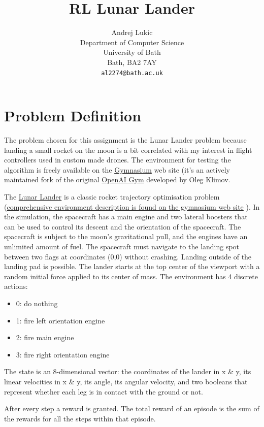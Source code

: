 \documentclass{article}
\title{RL Lunar Lander}
\author{
  Andrej Lukic
  \\
  Department of Computer Science\\
  University of Bath\\
  Bath, BA2 7AY \\
  \texttt{al2274@bath.ac.uk} \\
}
\begin{document}
\maketitle

\section{Problem Definition}
The problem chosen for this assignment is the Lunar Lander problem because landing a small rocket on the moon is a bit correlated with my interest in flight controllers used in custom made drones. The environment for testing the algorithm is freely available on the \href{https://gymnasium.farama.org}{Gymnasium} web site (it's an actively maintained fork of the original \href{https://github.com/openai/gym}{OpenAI Gym} developed by Oleg Klimov.

The \href{https://gymnasium.farama.org/environments/box2d/lunar_lander/}{Lunar Lander}  is a classic rocket trajectory optimisation problem (\href{https://gymnasium.farama.org/environments/box2d/lunar_lander/}{comprehensive environment description is found on the gymnasium web site} ). In the simulation, the spacecraft has a main engine and two lateral boosters that can be used to control its descent and the orientation of the spacecraft. The spacecraft is subject to the moon's gravitational pull, and the engines have an unlimited amount of fuel. The spacecraft must navigate to the landing spot between two flags at coordinates (0,0) without crashing. Landing outside of the landing pad is possible. The lander starts at the top center of the viewport with a random initial force applied to its center of mass. The environment has 4 discrete actions: 

\begin{itemize}
  \item 0: do nothing
  \item 1: fire left orientation engine
  \item 2: fire main engine
  \item 3: fire right orientation engine
\end{itemize}

The state is an 8-dimensional vector: the coordinates of the lander in x \& y, its linear velocities in x \& y, its angle, its angular velocity, and two booleans that represent whether each leg is in contact with the ground or not.

After every step a reward is granted. The total reward of an episode is the sum of the rewards for all the steps within that episode.
\end{document}
